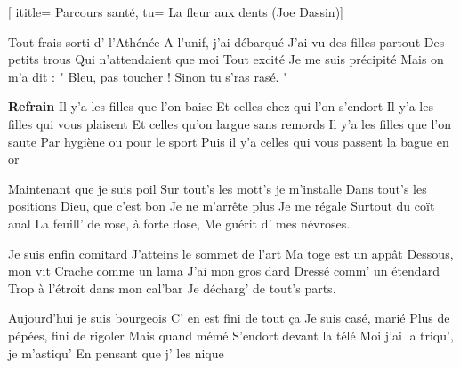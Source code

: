  [
ititle= {Parcours santé},
tu= {La fleur aux dents (Joe Dassin)}]


\beginsong
Tout frais sorti d' l'Athénée
A l'unif, j'ai débarqué
J'ai vu des filles partout
Des petits trous
Qui n'attendaient que moi
Tout excité
Je me suis précipité
Mais on m'a dit : " Bleu, pas toucher !
Sinon tu s'ras rasé. "
\endverse

\beginchorus
\textbf {Refrain}
Il y'a les filles que l'on baise
Et celles chez qui l'on s'endort
Il y'a les filles qui vous plaisent
Et celles qu'on largue sans remords
Il y'a les filles que l'on saute
Par hygiène ou pour le sport
Puis il y'a celles qui vous passent la bague en or
\endchorus

\beginverse
Maintenant que je suis poil
Sur tout's les mott's je m'installe
Dans tout's les positions
Dieu, que c'est bon
Je ne m'arrête plus
Je me régale
Surtout du coït anal
La feuill' de rose, à forte dose,
Me guérit d' mes névroses.
\endverse

\beginverse
Je suis enfin comitard
J'atteins le sommet de l'art
Ma toge est un appât
Dessous, mon vit
Crache comme un lama
J'ai mon gros dard
Dressé comm' un étendard
Trop à l'étroit dans mon cal'bar
Je décharg' de tout's parts.
\endverse

\beginverse
Aujourd'hui je suis bourgeois
C' en est fini de tout ça
Je suis casé, marié
Plus de pépées, fini de rigoler
Mais quand mémé
S'endort devant la télé
Moi j'ai la triqu', je m'astiqu'
En pensant que j' les nique
\endverse

\endsong